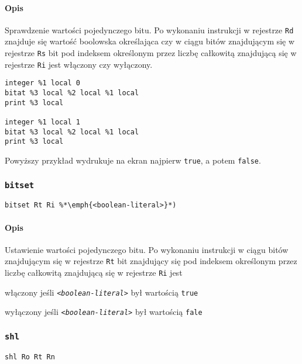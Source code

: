 \paragraph*{Opis} Sprawdzenie wartości pojedynczego bitu.
Po wykonaniu instrukcji w rejestrze \texttt{Rd} znajduje się wartość boolowska
określająca czy w ciągu bitów znajdującym się w rejestrze \texttt{Rs} bit pod
indeksem określonym przez liczbę całkowitą znajdującą się w rejestrze
\texttt{Ri} jest włączony czy wyłączony.

\begin{lstlisting}
integer %1 local 0
bitat %3 local %2 local %1 local
print %3 local

integer %1 local 1
bitat %3 local %2 local %1 local
print %3 local
\end{lstlisting}
Powyższy przykład wydrukuje na ekran najpierw \texttt{true}, a potem
\texttt{false}.

\subsubsection{\texttt{bitset}}

\begin{lstlisting}
bitset Rt Ri %*\emph{<boolean-literal>}*)
\end{lstlisting}

\paragraph*{Opis} Ustawienie wartości pojedynczego bitu.
Po wykonaniu instrukcji w ciągu bitów znajdującym się w rejestrze \texttt{Rt}
bit znajdujący się pod indeksem określonym przez liczbę całkowitą znajdującą
się w rejestrze \texttt{Ri} jest
\begin{enumerate*}[label=(\arabic*)]
\item włączony jeśli \texttt{\emph{<boolean-literal>}} był wartością
    \texttt{true}
\item wyłączony jeśli \texttt{\emph{<boolean-literal>}} był wartością
    \texttt{fale}
\end{enumerate*}

\subsubsection{\texttt{shl}}

\begin{lstlisting}
shl Ro Rt Rn
\end{lstlisting}

